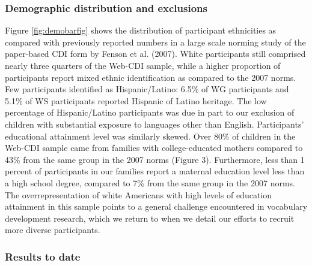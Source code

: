 \documentclass[
  english,
  man]{apa7}
\begin{document}
\hypertarget{demographic-distribution-and-exclusions}{%
\subsubsection{Demographic distribution and exclusions}\label{demographic-distribution-and-exclusions}}

Figure \ref{fig:demobarfig} shows the distribution of participant ethnicities as compared with previously reported numbers in a large scale norming study of the paper-based CDI form by Fenson et al. (2007). White participants still comprised nearly three quarters of the Web-CDI sample, while a higher proportion of participants report mixed ethnic identification as compared to the 2007 norms. Few participants identified as Hispanic/Latino: 6.5\% of WG participants and 5.1\% of WS participants reported Hispanic of Latino heritage. The low percentage of Hispanic/Latino participants was due in part to our exclusion of children with substantial exposure to languages other than English. Participants' educational attainment level was similarly skewed. Over 80\% of children in the Web-CDI sample came from families with college-educated mothers compared to 43\% from the same group in the 2007 norms (Figure 3). Furthermore, less than 1 percent of participants in our families report a maternal education level less than a high school degree, compared to 7\% from the same group in the 2007 norms. The overrepresentation of white Americans with high levels of education attainment in this sample points to a general challenge encountered in vocabulary development research, which we return to when we detail our efforts to recruit more diverse participants.

\hypertarget{results-to-date}{%
\subsubsection{Results to date}\label{results-to-date}}
\end{document}
